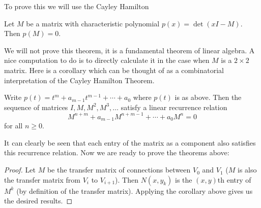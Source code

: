 To prove this we will use the Cayley Hamilton

\begin{theorem}
Let $M$ be a matrix with characteristic polynomial $p(x) = \det(xI - M)$. Then $p(M) = 0$.
\end{theorem}

We will not prove this theorem, it is a fundamental theorem of linear algebra. A nice computation to do is to directly calculate it in the case when $M$ is a $2 \times 2$ matrix. Here is a corollary which can be thought of as a combinatorial interpretation of the Cayley Hamilton Theorem.

\begin{corollary}
Write $p(t) = t^m + a_{m-1}t^{m-1} + \cdots + a_0$ where $p(t)$ is as above. Then the sequence of matrices $I, M, M^2, M^3, \dots$ satisfy a linear recurrence relation
\[M^{n + m} + a_{m-1}M^{n + m - 1} + \cdots + a_0M^{n} = 0\]
for all $n \geq 0$.
\end{corollary}

It can clearly be seen that each entry of the matrix as a component also satisfies this recurrence relation. Now we are ready to prove the theorems above:
\begin{proof}
Let $M$ be the transfer matrix of connections between $V_0$ and $V_1$ ($M$ is also the transfer matrix from $V_i$ to $V_{i + 1}$). Then $N(x, y_k)$ is the $(x, y)$th entry of $M^k$ (by definition of the transfer matrix). Applying the corollary above gives us the desired results.
\end{proof}